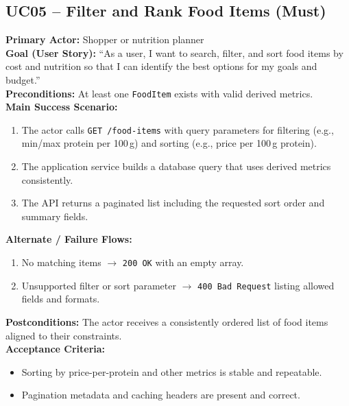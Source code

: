 \documentclass[11pt]{article}
\begin{document}
\subsection*{UC05 -- Filter and Rank Food Items (Must)}
\textbf{Primary Actor:} Shopper or nutrition planner\\
\textbf{Goal (User Story):} ``As a user, I want to search, filter, and sort food items by cost and nutrition so that I can identify the best options for my goals and budget.''\\
\textbf{Preconditions:} At least one \texttt{FoodItem} exists with valid derived metrics.\\
\textbf{Main Success Scenario:}
\begin{enumerate}[label=\arabic*.]
  \item The actor calls \texttt{GET /food-items} with query parameters for filtering (e.g., min/max protein per 100\,g) and sorting (e.g., price per 100\,g protein).
  \item The application service builds a database query that uses derived metrics consistently.
  \item The API returns a paginated list including the requested sort order and summary fields.
\end{enumerate}
\textbf{Alternate / Failure Flows:}
\begin{enumerate}[label=\arabic*F.]
  \item No matching items $\rightarrow$ \texttt{200 OK} with an empty array.
  \item Unsupported filter or sort parameter $\rightarrow$ \texttt{400 Bad Request} listing allowed fields and formats.
\end{enumerate}
\textbf{Postconditions:} The actor receives a consistently ordered list of food items aligned to their constraints.\\
\textbf{Acceptance Criteria:}
\begin{itemize}[noitemsep]
  \item Sorting by price-per-protein and other metrics is stable and repeatable.
  \item Pagination metadata and caching headers are present and correct.
\end{itemize}
\end{document}
